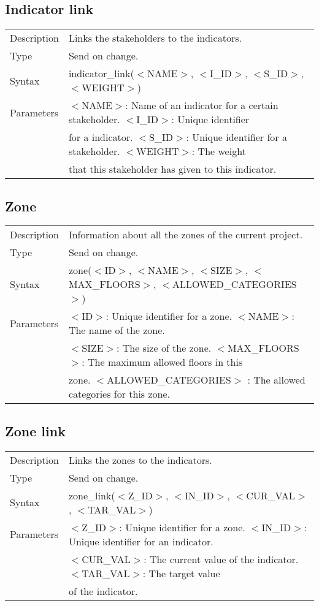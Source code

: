 \documentclass{article}
\begin{document}
\subsection*{Indicator link}

\begin{tabular}{ l l }
  Description & Links the stakeholders to the indicators.  \\
  Type & Send on change. \\
  Syntax & indicator\_link($<$NAME$>$, $<$I\_ID$>$, $<$S\_ID$>$, $<$WEIGHT$>$) \\
  Parameters &  $<$NAME$>$: Name of an indicator for a certain stakeholder. $<$I\_ID$>$: Unique identifier \\
    & for a indicator. $<$S\_ID$>$:  Unique identifier for a stakeholder. $<$WEIGHT$>$: The weight \\
    & that this stakeholder has given to this indicator.
\end{tabular}

\subsection*{Zone}

\begin{tabular}{ l l }
  Description & Information about all the zones of the current project. \\
  Type & Send on change. \\
  Syntax & zone($<$ID$>$, $<$NAME$>$, $<$SIZE$>$, $<$MAX\_FLOORS$>$, $<$ALLOWED\_CATEGORIES$>$) \\
  Parameters &  $<$ID$>$: Unique identifier for a zone. $<$NAME$>$: The name of the zone. \\
    & $<$SIZE$>$: The size of the zone. $<$MAX\_FLOORS$>$: The maximum allowed floors in this \\
    & zone. $<$ALLOWED\_CATEGORIES$>$ : The allowed categories for this zone.
\end{tabular}

\subsection*{Zone link}

\begin{tabular}{ l l }
  Description & Links the zones to the indicators.  \\
  Type & Send on change. \\
  Syntax & zone\_link($<$Z\_ID$>$, $<$IN\_ID$>$, $<$CUR\_VAL$>$, $<$TAR\_VAL$>$) \\
  Parameters &  $<$Z\_ID$>$: Unique identifier for a zone. $<$IN\_ID$>$: Unique identifier for an indicator. \\
    & $<$CUR\_VAL$>$: The current value of the indicator. $<$TAR\_VAL$>$:  The target value \\
    & of the indicator.
\end{tabular}
\end{document}
